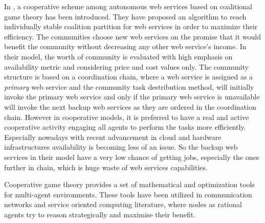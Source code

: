         In \cite{10.1109/TSC.2012.12}, a cooperative scheme among autonomous
        web services based on coalitional game theory has been introduced. They have proposed an algorithm to
        reach individually stable coalition partition for web services in order to
        maximize their efficiency. The communities choose new web services on the promise
        that it would benefit the community without decreasing any other web service's
        income. In their model, the worth of community is evaluated with high emphasis on
        availability metric and considering price and cost values only. The community structure is based on a coordination chain,
        where a web service is assigned as a \emph{primary} web service and the community task destribution
        method, will initially invoke the primary web service and only if the primary web service is unavailable
        will invoke the next backup web services as they are ordered in the coordination chain. However in cooperative models, it is preferred to
        have a real and active cooperative activity engaging all agents to perform the tasks more efficiently. Especially nowadays
        with recent advancement in cloud and hardware infrastructures availability is becoming less of an issue. So the backup web services
        in their model have a very low chance of getting jobs, especially the ones further in chain, which is huge waste of web services
        capabilities.

Cooperative game theory provides a set of mathematical and optimization tools for multi-agent environments. These tools have been utilized in communication networks and service oriented computing literature, where nodes as rational agents try to reason strategically and maximise their benefit.





